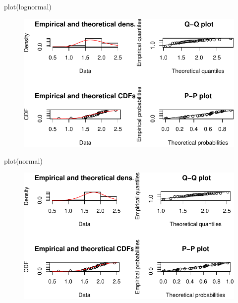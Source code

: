 \documentclass[
  letterpaper,
  DIV=11,
  numbers=noendperiod]{scrartcl}
\newenvironment{Shaded}{\begin{snugshade}}{\end{snugshade}}
\newcommand{\FunctionTok}[1]{\textcolor[rgb]{0.28,0.35,0.67}{#1}}
\newcommand{\NormalTok}[1]{\textcolor[rgb]{0.00,0.23,0.31}{#1}}
\begin{document}
\begin{Shaded}
\begin{Highlighting}[]
\FunctionTok{plot}\NormalTok{(lognormal)}
\end{Highlighting}
\end{Shaded}

\begin{figure}[H]

{\centering \includegraphics{quiz5_files/figure-pdf/unnamed-chunk-15-1.pdf}

}

\end{figure}

\begin{Shaded}
\begin{Highlighting}[]
\FunctionTok{plot}\NormalTok{(normal)}
\end{Highlighting}
\end{Shaded}

\begin{figure}[H]

{\centering \includegraphics{quiz5_files/figure-pdf/unnamed-chunk-16-1.pdf}

}

\end{figure}
\end{document}
